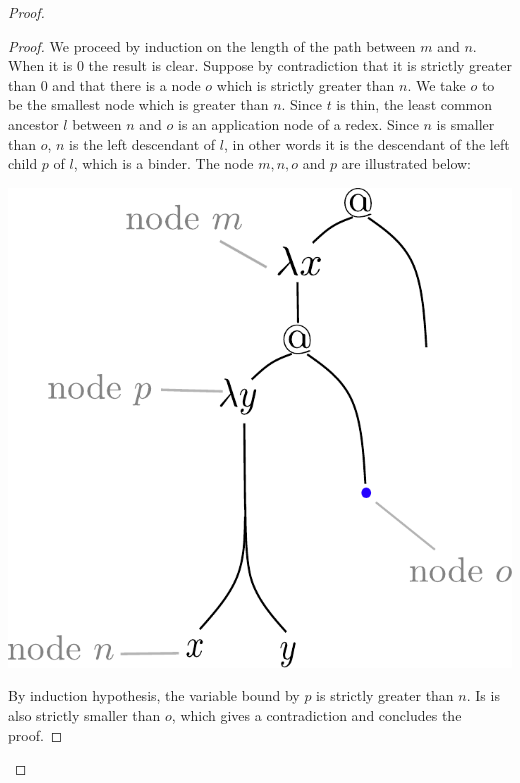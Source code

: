 \begin{proof}
\begin{proof}
We proceed by induction on the length of the path between $m$ and $n$. When it is $0$ the result is clear. Suppose by contradiction that it is strictly greater than $0$ and that there is a node $o$ which is strictly greater than $n$. We take $o$ to be the smallest node which is greater than $n$. Since $t$ is thin, the least common ancestor $l$ between $n$ and $o$ is an application node of a redex. Since $n$ is smaller than $o$, $n$ is the left descendant  of $l$, in other words it is the descendant of the left child $p$
of $l$, which is a binder. The node $m, n, o$ and $p$ are illustrated below:
\begin{center}
		\includegraphics[scale=.3]{pictures/lemma-thin.pdf}
\end{center} 
 By induction hypothesis, the variable
bound by $p$ is strictly greater than $n$. Is is also strictly smaller than $o$, which gives a contradiction and concludes the proof. 
\end{proof}


\end{proof}
